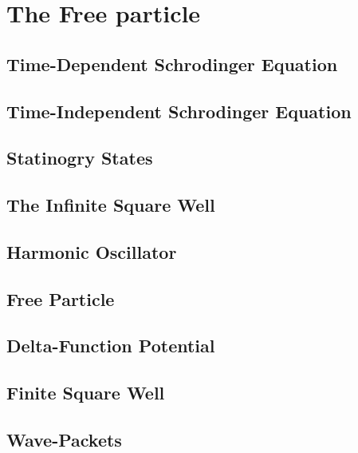 \chapter{The Free particle}
\section{Time-Dependent Schrodinger Equation}
\section{Time-Independent Schrodinger Equation}
\section{Statinogry States}
\section{The Infinite Square Well}
\section{Harmonic Oscillator}
\section{Free Particle}
\section{Delta-Function Potential}
\section{Finite Square Well}
\section{Wave-Packets}